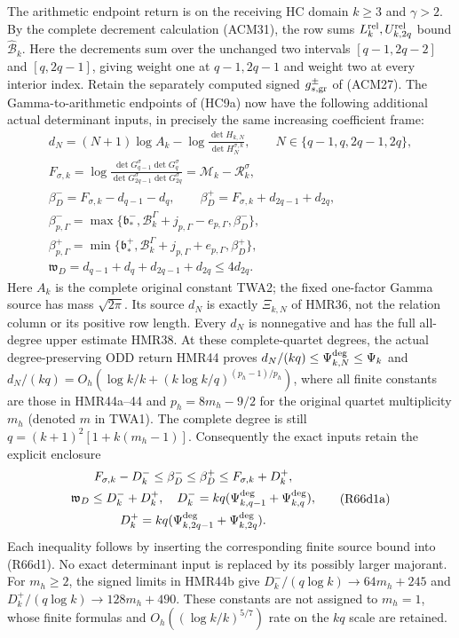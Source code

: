 The arithmetic endpoint return is on the receiving HC domain
$k\geq3$ and $\gamma>2$. By the complete decrement calculation
(ACM31), the row sums $L_k^{\rm rel},U_{k,2q}^{\rm rel}$
bound $\widehat{\mathcal B}_k$. Here the decrements sum over
the unchanged two intervals $[q-1,2q-2]$ and $[q,2q-1]$,
giving weight one at $q-1,2q-1$ and weight two at every
interior index. Retain the separately computed signed
$g_{s,\rm gr}^{\pm}$ of (ACM27). The Gamma-to-arithmetic
endpoints of (HC9a) now have the following additional
actual determinant inputs, in precisely the same increasing
coefficient frame:
\[
\begin{gathered}
 d_N=(N+1)\log A_k-
       \log\frac{\det H_{k,N}}{\det H_N^{\sigma,k}},\qquad
 N\in\{q-1,q,2q-1,2q\},\\
 F_{\sigma,k}
 =\log\frac{\det G_{q-1}^{\sigma}\det G_q^{\sigma}}
                {\det G_{2q-1}^{\sigma}\det G_{2q}^{\sigma}}
 =\mathcal M_k-\mathcal R_k^\sigma,\\
 \beta_D^-=F_{\sigma,k}-d_{q-1}-d_q,\qquad
 \beta_D^+=F_{\sigma,k}+d_{2q-1}+d_{2q},\\
 \beta_{p,\Gamma}^-=\max\{
 \mathfrak b_*^-,
 \mathcal B_k^\Gamma+j_{p,\Gamma}-e_{p,\Gamma},\beta_D^-\},\\
 \beta_{p,\Gamma}^+=\min\{
 \mathfrak b_*^+,
 \mathcal B_k^\Gamma+j_{p,\Gamma}+e_{p,\Gamma},\beta_D^+\},\\
 \mathfrak w_D=d_{q-1}+d_q+d_{2q-1}+d_{2q}
                  \leq4d_{2q}.
\end{gathered}\tag{R66d1}
\]
Here $A_k$ is the complete original constant TWA2; the
fixed one-factor Gamma source has mass $\sqrt{2\pi}$.
Its source $d_N$ is exactly $\Xi_{k,N}$ of HMR36, not
the relation column or its positive row length.
Every $d_N$ is nonnegative and has the full all-degree
upper estimate HMR38. At these complete-quartet degrees,
the actual degree-preserving ODD return HMR44 proves
$d_N/(kq)\leq\Psi_{k,N}^{\rm deg}\leq\Psi_k$ and
$d_N/(kq)=O_h(\log k/k+(k\log k/q)^{(p_h-1)/p_h})$,
where all finite constants are those in HMR44a--44 and
$p_h=8m_h-9/2$ for the original quartet multiplicity $m_h$
(denoted $m$ in TWA1). The complete degree is still
$q=(k+1)^2[1+k(m_h-1)]$. Consequently the exact inputs retain
the explicit enclosure
\[
\begin{gathered}
 F_{\sigma,k}-D_k^-\leq\beta_D^-\leq\beta_D^+
                         \leq F_{\sigma,k}+D_k^+,\\
 \mathfrak w_D\leq D_k^-+D_k^+,
 \quad D_k^-=kq(\Psi_{k,q-1}^{\rm deg}+\Psi_{k,q}^{\rm deg}),\\
 D_k^+=kq(\Psi_{k,2q-1}^{\rm deg}+\Psi_{k,2q}^{\rm deg}).
\end{gathered}\tag{R66d1a}
\]
Each inequality follows by inserting the corresponding finite
source bound into (R66d1). No exact determinant input is replaced
by its possibly larger majorant. For $m_h\geq2$, the signed
limits in HMR44b give
$D_k^-/(q\log k)\to64m_h+245$ and
$D_k^+/(q\log k)\to128m_h+490$. These constants are not
assigned to $m_h=1$, whose finite formulas and
$O_h((\log k/k)^{5/7})$ rate on the $kq$ scale are retained.

